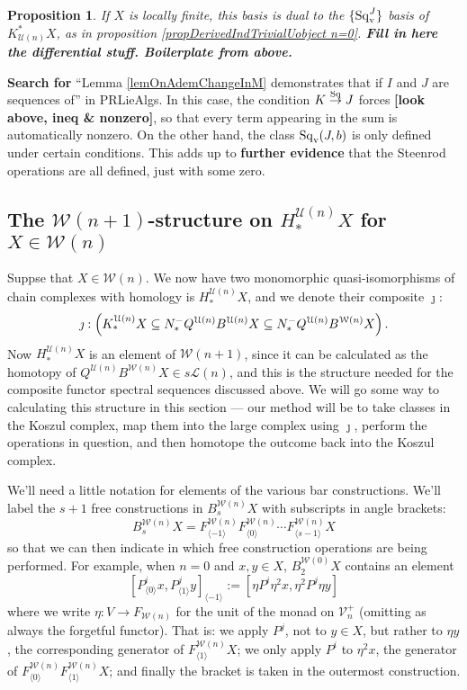 \documentclass[11pt]{amsart}
\theoremstyle{plain}
\newtheorem{prop}[thm]{Proposition}
\theoremstyle{definition}
\renewcommand{\to}{\longrightarrow}
\newcommand{\calW}{\mathcal{W}}
\newcommand{\calU}{\mathcal{U}}
\newcommand{\calL}{\mathcal{L}}
\newcommand{\calV}{\mathcal{V}}
\theoremstyle{plain}
\newcommand{\vect}[2]{\calV^{#1}_{#2}}
\newcommand{\produces}[3]{#3:#1\sim #2}
\renewcommand{\produces}[3]{#1\rightarrow_{#3} #2}%
\renewcommand{\produces}[3]{#1\overset{\smash{#3}}{\rightarrow} #2}%
\newcommand{\Nop}{N^{\smash{-}}}
\newcommand{\Sq}{\mathrm{Sq}}
\begin{document}
\begin{Koszul complexes}
\begin{prop}
If $X$ is locally finite, this basis is dual to the $\{\Sq_\textup{v}^J\}$ basis of $K^*_{\calU(n)}X$, as in proposition \ref{propDerivedIndTrivialUobject n=0}. \textbf{Fill in here the differential stuff. Boilerplate from above.}
\end{prop}
\textbf{Search for }``Lemma \ref{lemOnAdemChangeInM} demonstrates that if $I$ and $J$ are sequences of'' in PRLieAlgs.
In this case, the condition $\produces{K}{J}{\Sq}$ forces \textbf{[look above, ineq \& nonzero]}, so that every term appearing in the sum is automatically nonzero. On the other hand, the class $\Sq_\textup{v}(J,b)$ is only defined under certain conditions. This adds up to \textbf{further evidence} that the Steenrod operations are all defined, just with some zero.
\subsection{The $\calW(n+1)$-structure on $H_*^{\calU(n)}X$ for $X\in\calW(n)$}
Suppse that $X\in\calW(n)$. We now have two monomorphic quasi-isomorphisms of chain complexes with homology is $H_*^{\calU(n)}X$, and we denote their composite $\jmath$:
\[\jmath:\left(K_*^{\calU(n)}X\subseteq \Nop_*Q^{\calU(n)}B^{\calU(n)}X\subseteq \Nop_*Q^{\calU(n)}B^{\calW(n)}X\right).\]
Now $H^{\calU(n)}_*X$ is an element of $\calW(n+1)$, since it can be calculated as the homotopy of $Q^{\calU(n)}B^{\calW(n)}X\in s\calL(n)$, and this is the structure needed for the composite functor spectral sequences discussed above. We will go some way to calculating this structure in this section --- our method will be to take classes in the Koszul complex, map them into the large complex using $\jmath$, perform the operations in question, and then homotope the outcome back into the Koszul complex.

We'll need a little notation for elements of the various bar constructions. We'll label the $s+1$ free constructions in $B^{\calW(n)}_{s}X$ with subscripts in angle brackets: 
\[B^{\calW(n)}_{s}X= F^{\calW(n)}_{\langle -1\rangle}F^{\calW(n)}_{\langle 0\rangle}\cdots F^{\calW(n)}_{\langle s-1\rangle}X\]%
so that we can then indicate in which free construction operations are being performed. For example, when $n=0$ and $x,y\in X$, $B_2^{\calW(0)}X$ contains an element
\[[P^i_{\langle 0\rangle}x,P^j_{\langle 1\rangle}y]_{\langle -1\rangle}:=[\eta P^i\eta^2 x,\eta^2P^j\eta y]\]%
where we write $\eta:V\to F_{\calW(n)}$ for the unit of the monad on $\vect{+}{n}$ (omitting as always the forgetful functor). That is: we apply $P^j$, not to $y\in X$, but rather to $\eta y$, the corresponding generator of $F_{\langle 1\rangle}^{\calW(n)}X$; we only apply $P^i$ to $\eta^2 x$, the generator of $F^{\calW(n)}_{\langle 0\rangle}F^{\calW(n)}_{\langle 1\rangle}X$; and finally the bracket is taken in the outermost construction.%


\end{Koszul complexes}
\end{document}
